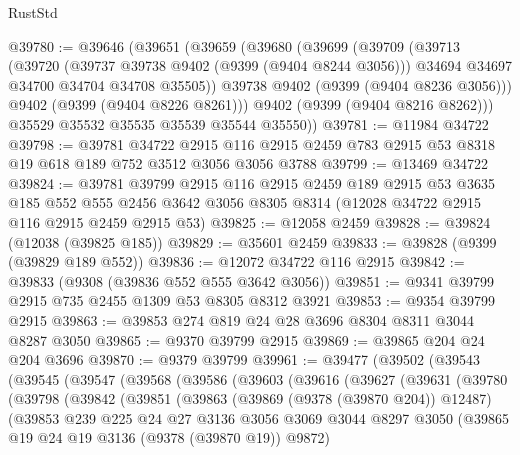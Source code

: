 \begin{lexlean}{RustStd}
\begin{coremodule}
@39780 := @39646
    (@39651
      (@39659
        (@39680
          (@39699
            (@39709
              (@39713
                (@39720
                  (@39737 @39738 @9402 (@9399 (@9404 @8244 @3056)))
                  @34694
                  @34697
                  @34700
                  @34704
                  @34708
                  @35505))
              @39738
              @9402
              (@9399 (@9404 @8236 @3056)))
            @9402
            (@9399 (@9404 @8226 @8261)))
          @9402
          (@9399 (@9404 @8216 @8262)))
        @35529
        @35532
        @35535
        @35539
        @35544
        @35550))
@39781 := @11984 @34722
@39798 := @39781
    @34722
    @2915
    @116
    @2915
    @2459
    @783
    @2915
    @53
    @8318
    @19
    @618
    @189
    @752
    @3512
    @3056
    @3056
    @3788
@39799 := @13469 @34722
@39824 := @39781
    @39799
    @2915
    @116
    @2915
    @2459
    @189
    @2915
    @53
    @3635
    @185
    @552
    @555
    @2456
    @3642
    @3056
    @8305
    @8314
    (@12028 @34722 @2915 @116 @2915 @2459 @2915 @53)
@39825 := @12058 @2459
@39828 := @39824 (@12038 (@39825 @185))
@39829 := @35601 @2459
@39833 := @39828 (@9399 (@39829 @189 @552))
@39836 := @12072 @34722 @116 @2915
@39842 := @39833 (@9308 (@39836 @552 @555 @3642 @3056))
@39851 := @9341 @39799 @2915 @735 @2455 @1309 @53 @8305 @8312 @3921
@39853 := @9354 @39799 @2915
@39863 := @39853 @274 @819 @24 @28 @3696 @8304 @8311 @3044 @8287 @3050
@39865 := @9370 @39799 @2915
@39869 := @39865 @204 @24 @204 @3696
@39870 := @9379 @39799
@39961 := @39477
    (@39502
      (@39543
        (@39545
          (@39547
            (@39568
              (@39586
                (@39603
                  (@39616
                    (@39627
                      (@39631
                        (@39780
                          (@39798
                            (@39842
                              (@39851
                                (@39863
                                  (@39869 (@9378 (@39870 @204)) @12487)
                                  (@39853
                                    @239
                                    @225
                                    @24
                                    @27
                                    @3136
                                    @3056
                                    @3069
                                    @3044
                                    @8297
                                    @3050
                                    (@39865 @19 @24 @19 @3136 (@9378 (@39870 @19)) @9872)

\end{coremodule}
\end{lexlean}
